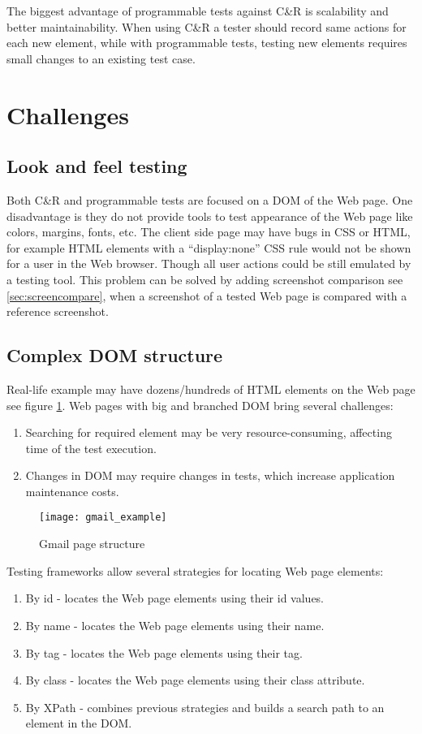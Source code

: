 The biggest advantage of programmable tests against C\&R is scalability and
better maintainability. When using C\&R a tester should record same actions for
each new element, while with  programmable tests, testing new elements requires
small changes to an existing test case. 

\section {Challenges}
	\label {sec:challenges}
	\subsection{Look and feel testing}
	    Both C\&R and programmable tests are focused on a DOM of the Web page.
	    One disadvantage is they do not provide tools to test appearance of the Web
	    page like colors, margins, fonts, etc. The client side page may have bugs in CSS
	    or HTML, for example HTML elements with a ``display:none'' CSS rule would
	    not be shown for a user in the Web browser.
	    Though all user actions could be still emulated by a testing tool. 
	    This problem can be solved by adding screenshot
      comparison see \ref{sec:screencompare}, when a screenshot of a tested Web
      page is compared with a reference screenshot. 
	\subsection{Complex DOM structure}
    Real-life example may have dozens/hundreds of HTML
		elements on the Web page see figure
		\ref{fig:gmailexample}.
		Web pages with big and branched DOM bring several challenges:
		\begin{enumerate}
		  \item Searching for required element may be very resource-consuming,
		  affecting time of the test execution. 
		  \item Changes in DOM may require changes in tests, which increase
		  application maintenance costs.
		\end{enumerate}
		
		\begin{figure}
		\centering
		  \texttt{[image: gmail\_example]}
		  \caption{Gmail page structure}
		  \label{fig:gmailexample}
		\end{figure}
		
		Testing frameworks allow several strategies for locating Web page elements:
		\begin{enumerate}
		  \item By id - locates the Web page elements using their id values.
		  \item By name - locates the Web page elements using their name.
		  \item By tag - locates the Web page elements using their tag.
		  \item By class - locates the Web page elements using their class attribute.
		  \item By XPath - combines previous strategies and builds a search
		  path to an element in the DOM.
		\end{enumerate}
		
